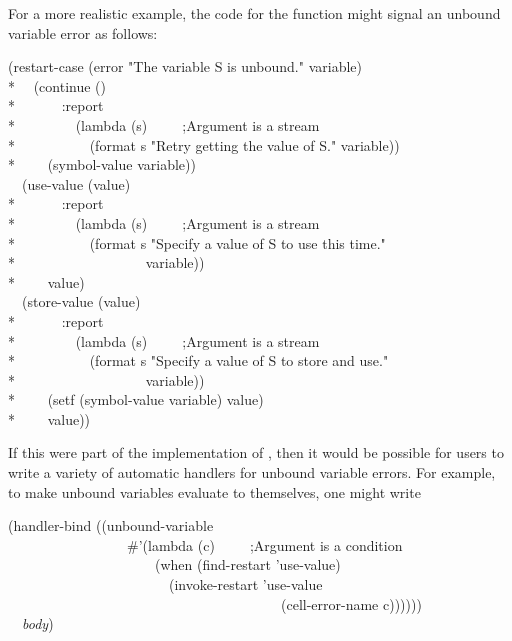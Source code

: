 For a more realistic example, the code for the function  might signal an
unbound variable error as follows:
\begin{lisp}
(restart-case (error "The variable {\Xtilde}S is unbound." variable) \\*
~~(continue () \\*
~~~~~~:report \\*
~~~~~~~~(lambda (s)~~~~~;{\rm Argument  is a stream} \\*
~~~~~~~~~~(format s "Retry getting the value of {\Xtilde}S." variable)) \\*
~~~~(symbol-value variable)) \\
~~(use-value (value) \\*
~~~~~~:report \\*
~~~~~~~~(lambda (s)~~~~~;{\rm Argument  is a stream} \\*
~~~~~~~~~~(format s "Specify a value of {\Xtilde}S to use this time." \\*
~~~~~~~~~~~~~~~~~~variable)) \\*
~~~~value) \\
~~(store-value (value) \\*
~~~~~~:report \\*
~~~~~~~~(lambda (s)~~~~~;{\rm Argument  is a stream} \\*
~~~~~~~~~~(format s "Specify a value of {\Xtilde}S to store and use." \\*
~~~~~~~~~~~~~~~~~~variable)) \\*
~~~~(setf (symbol-value variable) value) \\*
~~~~value))
\end{lisp}
If this were part of the implementation of , then it would be possible
for users to write a variety of automatic handlers for unbound variable
errors. For example, to make unbound variables evaluate to themselves, one
might write
\begin{lisp}
(handler-bind ((unbound-variable \\
~~~~~~~~~~~~~~~~~\#'(lambda (c)~~~~~;{\rm Argument  is a condition} \\
~~~~~~~~~~~~~~~~~~~~~(when (find-restart 'use-value) \\
~~~~~~~~~~~~~~~~~~~~~~~(invoke-restart 'use-value \\
~~~~~~~~~~~~~~~~~~~~~~~~~~~~~~~~~~~~~~~(cell-error-name c)))))) \\
~~{\it body})
\end{lisp}


